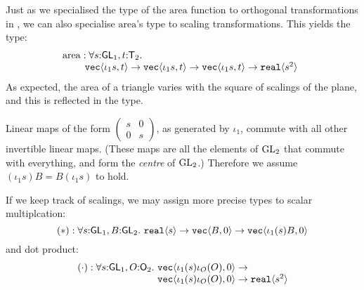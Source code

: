 \begin{example}\label{ex:area-of-triangle-2}
  Just as we specialised the type of the $\mathrm{area}$ function to
  orthogonal transformations in , we can
  also specialise $\mathrm{area}$'s type to scaling
  transformations. This yields the type:
  \begin{displaymath}
    \begin{array}{@{}l}
      \mathrm{area} : \forall s\mathord:\SynGL{1}, t\mathord:\SynTransl{2}.\ \\
      \hspace{0.8cm} \tyPrim{vec}{\iota_1s, t} \to \tyPrim{vec}{\iota_1s, t} \to \tyPrim{vec}{\iota_1s, t} \to \tyPrim{real}{s^2}
    \end{array}
  \end{displaymath}
  As expected, the area of a triangle varies with the square of
  scalings of the plane, and this is reflected in the type.
\end{example}

Linear maps of the form $\left(
  \begin{smallmatrix}s & 0 \\ 0 & s\end{smallmatrix}\right)$, as
generated by $\iota_1$, commute with all other invertible linear
maps. (These maps are all the elements of $\mathrm{GL}_2$ that commute with
everything, and form the \emph{centre} of $\mathrm{GL}_2$.) Therefore we
assume $(\iota_1 s)B = B(\iota_1 s)$ to hold.

If we keep track of scalings, we may assign more precise types to
scalar multiplcation:
\begin{displaymath}
  (*) : \forall s \mathord: \mathsf{GL}_1, B \mathord: \mathsf{GL}_2.\ \texttt{real}\langle s \rangle \to \texttt{vec}\langle B,0 \rangle \to \texttt{vec}\langle \iota_1(s)B,0 \rangle
\end{displaymath}
and dot product:
\begin{displaymath}
  \begin{array}{l@{}l}
    (\cdot) : \forall s \mathord: \SynGL{1}, O \mathord: \SynOrth{2}.\ & \tyPrim{vec}{\iota_1(s)\iota_O(O),0} \to\\
    &\tyPrim{vec}{\iota_1(s)\iota_O(O),0} \to \tyPrim{real}{s^2}
  \end{array}
\end{displaymath}

